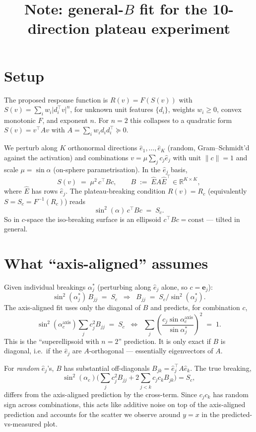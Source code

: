 \documentclass[11pt]{article}
\title{Note: general-$B$ fit for the 10-direction plateau experiment}
\author{}
\date{}
\newcommand{\RR}{\mathbb{R}}
\begin{document}
\maketitle

\section{Setup}

The proposed response function is $R(v) = F(S(v))$ with
$S(v) = \sum_i w_i \lvert d_i^\top v\rvert^n$,
for unknown unit features $\{d_i\}$, weights $w_i \ge 0$, convex monotonic $F$, and exponent $n$. For $n=2$ this collapses to a quadratic form $S(v) = v^\top A v$ with $A = \sum_i w_i d_i d_i^\top \succeq 0$.

We perturb along $K$ orthonormal directions $\hat e_1, \dots, \hat e_K$ (random, Gram--Schmidt'd against the activation) and combinations $v = \mu \sum_j c_j \hat e_j$ with unit $\|c\|=1$ and scale $\mu = \sin\alpha$ (on-sphere parametrisation). In the $\hat e_j$ basis,
\[
  S(v) \;=\; \mu^2 \, c^\top B c, \qquad B \;:=\; \hat E A \hat E^\top \in \RR^{K\times K},
\]
where $\hat E$ has rows $\hat e_j$. The plateau-breaking condition $R(v) = R_c$ (equivalently $S = S_c = F^{-1}(R_c)$) reads
\[
  \sin^2(\alpha) \, c^\top B c \;=\; S_c.
\]
So in $c$-space the iso-breaking surface is an ellipsoid $c^\top B c = \text{const}$ --- tilted in general.

\section{What ``axis-aligned'' assumes}

Given individual breakings $\alpha_j^*$ (perturbing along $\hat e_j$ alone, so $c = \mathbf{e}_j$):
\[
  \sin^2(\alpha_j^*) \, B_{jj} \;=\; S_c
  \;\;\Longrightarrow\;\;
  B_{jj} \;=\; S_c / \sin^2(\alpha_j^*).
\]
The axis-aligned fit uses only the diagonal of $B$ and predicts, for combination $c$,
\[
  \sin^2(\alpha^{\text{axis}}_c) \sum_{j} c_j^2 B_{jj} \;=\; S_c
  \;\;\Longleftrightarrow\;\;
  \sum_j \left(\frac{c_j \sin\alpha^{\text{axis}}_c}{\sin\alpha_j^*}\right)^2 \;=\; 1.
\]
This is the ``superellipsoid with $n=2$'' prediction. It is only exact if $B$ is diagonal, i.e.\ if the $\hat e_j$ are $A$-orthogonal --- essentially eigenvectors of $A$.

For \emph{random} $\hat e_j$'s, $B$ has substantial off-diagonals $B_{jk} = \hat e_j^\top A \hat e_k$. The true breaking,
\[
  \sin^2(\alpha_c) \bigg(\sum_j c_j^2 B_{jj} + 2\sum_{j<k} c_j c_k B_{jk}\bigg) = S_c,
\]
differs from the axis-aligned prediction by the cross-term. Since $c_j c_k$ has random sign across combinations, this acts like additive noise on top of the axis-aligned prediction and accounts for the scatter we observe around $y=x$ in the predicted-vs-measured plot.
\end{document}

